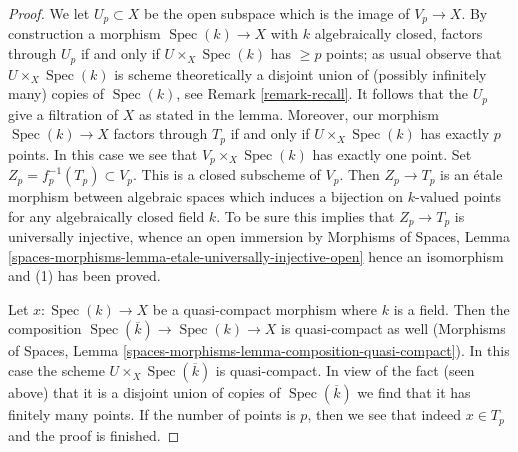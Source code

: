 \documentclass{stacks-project}
\theoremstyle{plain}
\theoremstyle{definition}
\theoremstyle{remark}
\numberwithin{equation}{subsection}
\def\Spec{\mathop{\mathrm{Spec}}}
\begin{document}
\begin{proof}
\medskip\noindent
We let $U_p \subset X$ be the open subspace which is the
image of $V_p \to X$. By construction a morphism $\Spec(k) \to X$ with
$k$ algebraically closed, factors through $U_p$ if and only if
$U \times_X \Spec(k)$ has $\geq p$ points; as usual observe that
$U \times_X \Spec(k)$ is scheme theoretically a disjoint union of
(possibly infinitely many) copies of $\Spec(k)$, see
Remark \ref{remark-recall}. It follows that
the $U_p$ give a filtration of $X$ as stated in the lemma.
Moreover, our morphism $\Spec(k) \to X$ factors through $T_p$
if and only if $U \times_X \Spec(k)$ has exactly $p$ points.
In this case we see that $V_p \times_X \Spec(k)$ has exactly one point.
Set $Z_p = f_p^{-1}(T_p) \subset V_p$. This is a closed subscheme of $V_p$.
Then $Z_p \to T_p$ is an \'etale morphism between
algebraic spaces which induces a bijection on $k$-valued
points for any algebraically closed field $k$. To be sure this
implies that $Z_p \to T_p$ is universally injective, whence an
open immersion by
Morphisms of Spaces, Lemma
\ref{spaces-morphisms-lemma-etale-universally-injective-open}
hence an isomorphism and (1) has been proved.

\medskip\noindent
Let $x : \Spec(k) \to X$ be a quasi-compact morphism where $k$ is a field.
Then the composition $\Spec(\overline{k}) \to \Spec(k) \to X$ is quasi-compact
as well (Morphisms of Spaces, Lemma
\ref{spaces-morphisms-lemma-composition-quasi-compact}).
In this case the scheme $U \times_X \Spec(\overline{k})$ is
quasi-compact. In view of the fact (seen above) that it is a disjoint union
of copies of $\Spec(\overline{k})$ we find that it has finitely many points.
If the number of points is $p$, then we see that indeed $x \in T_p$ and
the proof is finished.
\end{proof}
\end{document}
